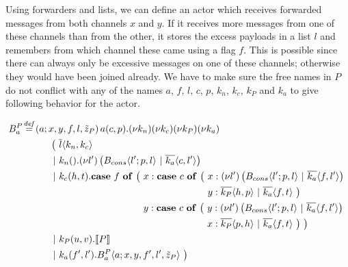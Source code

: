 Using forwarders and lists, we can define an actor which receives
forwarded messages from both channels $x$ and $y$.
If it receives more messages from one of these channels than from the other,
it stores the excess payloads in a list $l$ and remembers from which channel
these came using a flag $f$.
This is possible since there can always only be excessive messages on one of these channels;
otherwise they would have been joined already.
We have to make sure the free names in $P$ do not conflict with any of the names
$a$, $f$, $l$, $c$, $p$, $k_n$, $k_c$, $k_P$ and $k_a$
to give following behavior for the actor.

\begin{align*}
  \adef*{B_a^P}{a}{x,y,f,l,\tilde{z}_P}{\arcv{a}{c,p} . \anew{k_n}{\anew{k_c}{\anew{k_P}{\anew{k_a}{
    \\
    &\hspace{1cm}
    \begin{aligned}[t]
      \big(\ &\asnd{l}{k_n,k_c}
      \\
      \apar  &\arcv{k_n}{} . \anew{l'}{\parens{\ains{B_{cons}}{l'}{p, l} \apar \asnd{k_a}{c, l'}}}
      \\
      \apar  &\arcv{k_c}{h,t} .
        \begin{aligned}[t]
          \acse*{f}{\big(\ 
            &\aalt{x}{
              \begin{aligned}[t]
                \acse*{c}{\big(\ 
                  &\aalt{x}{\anew*{l'}{
                    \ains{B_{cons}}{l'}{p,l} \apar \asnd{k_a}{f,l'}
                  }}\\
                  &\aalt{y}{
                    \asnd{k_P}{h,p} \apar \asnd{k_a}{f,t}
                  }\ 
                \big)}
              \end{aligned}
            }\\
            &\aalt{y}{
              \begin{aligned}[t]
                \acse*{c}{\big(\ 
                  &\aalt{y}{\anew*{l'}{
                    \ains{B_{cons}}{l'}{p,l} \apar \asnd{k_a}{f,l'}
                  }}\\
                  &\aalt{x}{
                    \asnd{k_P}{p,h} \apar \asnd{k_a}{f,t}
                  }\ 
                \big)}
                \ \big)
              \end{aligned}
            }\ 
          }
        \end{aligned}
      \\
      \apar  &\arcv{k_P}{u,v} . \encMJtoAP{P}
      \\
      \apar  &\arcv{k_a}{f',l'} . \ains{B_a^P}{a}{x, y, f', l',\tilde{z}_P}
      \ \big)
    \end{aligned}
  }}}}} \\
\end{align*}

